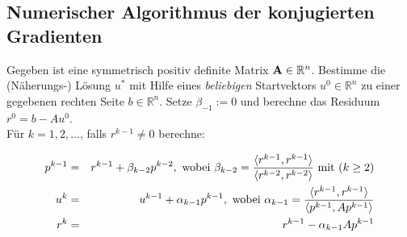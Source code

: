 






\subsection{Numerischer Algorithmus der konjugierten Gradienten}\label{ss.Numerisches CG}

Gegeben ist eine symmetrisch positiv definite Matrix ${\textbf{A}} \in \mathbb{R}^{n}$. Bestimme die (Näherungs-) Lösung $u^{*}$ mit Hilfe eines \textit{beliebigen} Startvektors $u^{0} \in \mathbb{R}^{n}$ zu einer gegebenen rechten Seite $b \in \mathbb{R}^{n}$. Setze $\beta_{-1} := 0$ und berechne das Residuum $r^{0} = b - Au^{0}$. \\
Für $k = 1,2,...$, falls $r^{k-1} \ne 0$ berechne:

\begin{eqnarray}
p^{k-1} &=& r^{k-1} + \beta_{k-2}p^{k-2}, \textnormal{ wobei } \beta_{k-2} = \frac {\langle r^{k-1}, r^{k-1} \rangle} {\langle r^{k-2}, r^{k-2} \rangle} \textnormal{ mit } (k \ge 2) \notag \\
u^{k} &=& u^{k-1} + \alpha_{k-1}p^{k-1}, \textnormal{ wobei } \alpha_{k-1} = \frac {\langle r^{k-1}, r^{k-1} \rangle} {\langle p^{k-1}, Ap^{k-1} \rangle} \notag \\
r^{k} &=& r^{k-1} - \alpha_{k-1}Ap^{k-1} \notag
\end{eqnarray}

